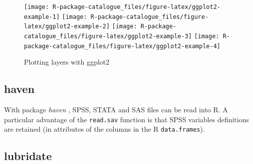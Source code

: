 \documentclass[]{book}
\newenvironment{Shaded}{\begin{snugshade}}{\end{snugshade}}
\newcommand{\KeywordTok}[1]{\textcolor[rgb]{0.13,0.29,0.53}{\textbf{#1}}}
\newcommand{\DataTypeTok}[1]{\textcolor[rgb]{0.13,0.29,0.53}{#1}}
\newcommand{\StringTok}[1]{\textcolor[rgb]{0.31,0.60,0.02}{#1}}
\newcommand{\CommentTok}[1]{\textcolor[rgb]{0.56,0.35,0.01}{\textit{#1}}}
\newcommand{\OperatorTok}[1]{\textcolor[rgb]{0.81,0.36,0.00}{\textbf{#1}}}
\newcommand{\NormalTok}[1]{#1}
\begin{document}
\begin{figure}

{\centering \texttt{[image: R-package-catalogue\_files/figure-latex/ggplot2-example-1]} \texttt{[image: R-package-catalogue\_files/figure-latex/ggplot2-example-2]} \texttt{[image: R-package-catalogue\_files/figure-latex/ggplot2-example-3]} \texttt{[image: R-package-catalogue\_files/figure-latex/ggplot2-example-4]} 

}

\caption{Plotting layers with ggplot2}\label{fig:ggplot2-example}
\end{figure}

\subsection{haven}\label{haven}

 

With package \emph{haven} \citep{R-haven}, SPSS, STATA and SAS files can
be read into R. A particular advantage of the \texttt{read.sav} function
is that SPSS variables definitions are retained (in attributes of the
columns in the R \texttt{data.frames}).

\begin{Shaded}
\end{Shaded}

\subsection{lubridate}\label{lubridate}
\end{document}
